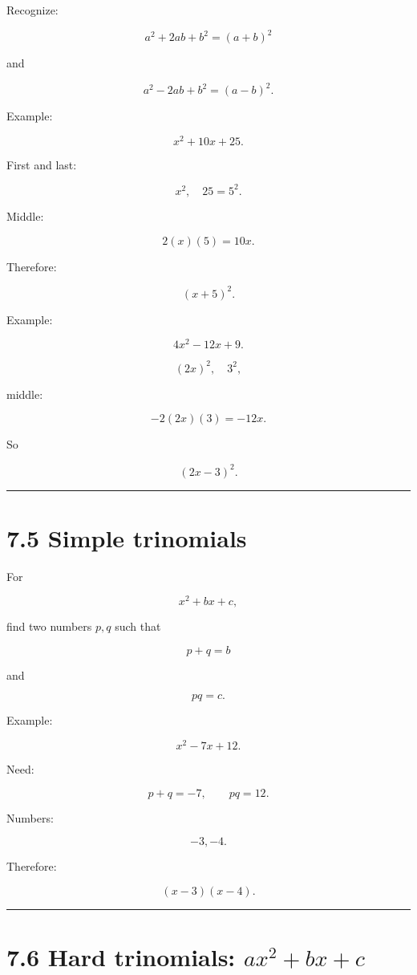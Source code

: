 \documentclass[
]{article}
\begin{document}
Recognize:

\[
a^2+2ab+b^2=(a+b)^2
\]

and

\[
a^2-2ab+b^2=(a-b)^2.
\]

Example:

\[
x^2+10x+25.
\]

First and last:

\[
x^2,\quad 25=5^2.
\]

Middle:

\[
2(x)(5)=10x.
\]

Therefore:

\[
\boxed{(x+5)^2}.
\]

Example:

\[
4x^2-12x+9.
\]

\[
(2x)^2,\quad 3^2,
\]

middle:

\[
-2(2x)(3)=-12x.
\]

So

\[
\boxed{(2x-3)^2}.
\]

\begin{center}\rule{0.5\linewidth}{0.5pt}\end{center}

\section{7.5 Simple trinomials}\label{simple-trinomials}

For

\[
x^2+bx+c,
\]

find two numbers \(p,q\) such that

\[
p+q=b
\]

and

\[
pq=c.
\]

Example:

\[
x^2-7x+12.
\]

Need:

\[
p+q=-7,\qquad pq=12.
\]

Numbers:

\[
-3,-4.
\]

Therefore:

\[
\boxed{(x-3)(x-4)}.
\]

\begin{center}\rule{0.5\linewidth}{0.5pt}\end{center}

\section{\texorpdfstring{7.6 Hard trinomials:
\(ax^2+bx+c\)}{7.6 Hard trinomials: ax\^{}2+bx+c}}\label{hard-trinomials-ax2bxc}
\end{document}
